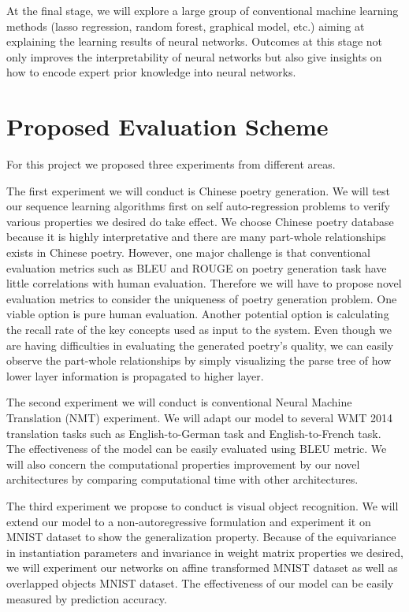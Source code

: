 \documentclass{article} \usepackage{tabularx}
\begin{document}
At the final stage, we will explore a large group of conventional
machine learning methods (lasso regression, random forest,
graphical model, etc.) aiming at explaining the learning results
of neural networks. Outcomes at this stage not only improves the
interpretability of neural networks but also give insights on how
to encode expert prior knowledge into neural networks.

\section{Proposed Evaluation Scheme}
\label{sec:eval}

For this project we proposed three experiments from different
areas.

The first experiment we will conduct is Chinese poetry
generation. We will test our sequence learning algorithms first
on self auto-regression problems to verify various properties we
desired do take effect. We choose Chinese poetry database because
it is highly interpretative and there are many part-whole
relationships exists in Chinese poetry. However, one major
challenge is that conventional evaluation metrics such as BLEU
and ROUGE on poetry generation task have little correlations with
human evaluation. Therefore we will have to propose novel
evaluation metrics to consider the uniqueness of poetry
generation problem. One viable option is pure human evaluation.
Another potential option is calculating the recall rate of the
key concepts used as input to the system. Even though we are
having difficulties in evaluating the generated poetry's quality,
we can easily observe the part-whole relationships by simply
visualizing the parse tree of how lower layer information is
propagated to higher layer.

The second experiment we will conduct is conventional Neural
Machine Translation (NMT) experiment. We will adapt our model to
several WMT 2014 translation tasks such as English-to-German task
and English-to-French task. The effectiveness of the model can be
easily evaluated using BLEU metric. We will also concern the
computational properties improvement by our novel architectures
by comparing computational time with other architectures.

The third experiment we propose to conduct is visual object
recognition. We will extend our model to a non-autoregressive
formulation and experiment it on MNIST dataset to show the
generalization property. Because of the equivariance in
instantiation parameters and invariance in weight matrix
properties we desired, we will experiment our networks on affine
transformed MNIST dataset as well as overlapped objects MNIST
dataset. The effectiveness of our model can be easily measured by
prediction accuracy.
\end{document}
